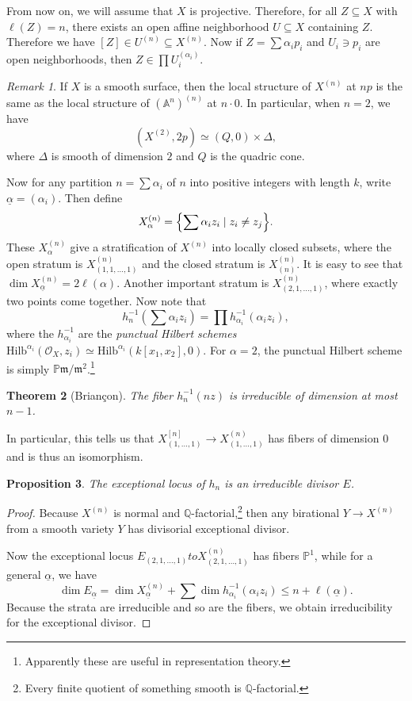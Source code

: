 \documentclass[leqno, openany]{memoir}
\newtheorem{thm}{Theorem}[section]
\newtheorem{prop}[thm]{Proposition}
\theoremstyle{definition}
\theoremstyle{remark}
\newtheorem{rmk}[thm]{Remark}
\theoremstyle{plain}
\theoremstyle{definition}
\theoremstyle{remark}
\newcommand{\A}{\mathbb{A}}
\newcommand{\Q}{\mathbb{Q}}
\renewcommand{\P}{\mathbb{P}}
\newcommand{\mc}[1]{\mathcal{#1}}
\newcommand{\mf}[1]{\mathfrak{#1}}
\newcommand{\mr}[1]{\mathrm{#1}}
\newcommand{\ul}[1]{\underline{#1}}
\begin{document}
From now on, we will assume that $X$ is projective. Therefore, for all $Z \subseteq X$ with $\ell(Z) = n$, there exists an open affine neighborhood $U \subseteq X$ containing $Z$. Therefore we have $[Z] \in U^{(n)} \subseteq X^{(n)}$. Now if $Z = \sum \alpha_i p_i$ and $U_i \ni p_i$ are open neighborhoods, then $Z \in \prod U_i^{(\alpha_i)}$.

\begin{rmk}
    If $X$ is a smooth surface, then the local structure of $X^{(n)}$ at $np$ is the same as the local structure of ${(\A^n)}^{(n)}$ at $n \cdot \qty{0}$. In particular, when $n = 2$, we have
    \[ (X^{(2)}, 2p) \simeq (Q, 0) \times \Delta, \]
    where $\Delta$ is smooth of dimension $2$ and $Q$ is the quadric cone.
\end{rmk}

Now for any partition $n = \sum \alpha_i$ of $n$ into positive integers with length $k$, write $\ul{\alpha} = (\alpha_i)$. Then define
\[ X_{\alpha}^{(n)} = \qty{ \sum \alpha_i z_i \mid z_i \neq z_j }. \]
These $X_{\alpha}^{(n)}$ give a stratification of $X^{(n)}$ into locally closed subsets, where the open stratum is $X^{(n)}_{(1,1,\ldots,1)}$ and the closed stratum is $X^{(n)}_{(n)}$. It is easy to see that $\dim X_{\ul{\alpha}}^{(n)} = 2 \ell(\alpha)$. Another important stratum is $X_{(2,1,\ldots,1)}^{(n)}$, where exactly two points come together. Now note that 
\[ h_n^{-1}(\sum \alpha_i z_i) = \prod h_{\alpha_i}^{-1} (\alpha_i z_i), \]
where the $h_{\alpha_i}^{-1}$ are the \textit{punctual Hilbert schemes} $\mr{Hilb}^{\alpha_i}(\mc{O}_X, z_i) \simeq \mr{Hilb}^{\alpha_i} ( k[x_1, x_2], 0 )$. For $\alpha = 2$, the punctual Hilbert scheme is simply $\P \mf{m}/\mf{m}^2$.\footnote{Apparently these are useful in representation theory.}

\begin{thm}[Brian\c{c}on]
    The fiber $h_n^{-1}(nz)$ is irreducible of dimension at most $n-1$.
\end{thm}

In particular, this tells us that $X^{[n]}_{(1,\ldots,1)} \to X^{(n)}_{(1,\ldots,1)}$ has fibers of dimension $0$ and is thus an isomorphism.

\begin{prop}
    The exceptional locus of $h_n$ is an irreducible divisor $E$.
\end{prop}

\begin{proof}
    Because $X^{(n)}$ is normal and $\Q$-factorial,\footnote{Every finite quotient of something smooth is $\Q$-factorial.} then any birational $Y \to X^{(n)}$ from a smooth variety $Y$ has divisorial exceptional divisor.

    Now the exceptional locus $E_{(2,1,\ldots,1)} to X^{(n)}_{(2,1,\ldots,1)}$ has fibers $\P^1$, while for a general $\ul{\alpha}$, we have
    \[ \dim E_{\ul{\alpha}} = \dim X_{\ul{\alpha}}^{(n)} + \sum \dim h_{\alpha_i}^{-1} (\alpha_i z_i) \leq n + \ell(\ul{\alpha}). \]
    Because the strata are irreducible and so are the fibers, we obtain irreducibility for the exceptional divisor.
\end{proof}
\end{document}
